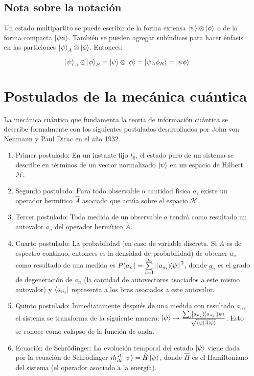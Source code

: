 \subsection{Nota sobre la notación}

Un estado multipartito se puede escribir de la forma extensa $\ket{\psi} \otimes \ket{\phi}$ o de la forma compacta $\ket{\psi \phi}$. También se pueden agregar subíndices para hacer énfasis en las particiones $\ket{\psi}_A \otimes \ket{\phi}$. Entonces:

\begin{equation*}
    \ket{\psi}_A \otimes \ket{\phi}_B = \ket{\psi} \otimes \ket{\phi} = \ket{\psi_A \phi_B} = \ket{\psi\phi}
\end{equation*}

\section{Postulados de la mecánica cuántica}

La mecánica cuántica que fundamenta la teoría de información cuántica se describe formalmente con los siguientes postulados desarrollados por John von Neumann y Paul Dirac en el año 1932.

\begin{enumerate}
    \item Primer postulado: En un instante fijo $t_0$, el estado puro de un sistema se describe en términos de un vector normalizado $\ket{\psi}$ en un espacio de Hilbert $\mathcal{H}$.
    \item Segundo postulado: Para todo observable o cantidad física $a$, existe un operador hermítico $\hat{A}$ asociado que actúa sobre el espacio $\mathcal{H}$
    \item Tercer postulado: Toda medida de un observable $a$ tendrá como resultado un autovalor $a_n$ del operador hermítico $\hat{A}$.
    \item Cuarto postulado: La probabilidad (en caso de variable discreta. Si $\hat{A}$ es de espectro continuo, entonces es la densidad de probabilidad) de obtener $a_n$ como resultado de una medida es $P(a_n) = \sum\limits_{i=1}^{g_n} \abs{\ketbra{a_{n_i}}{\psi}}^2$, donde $g_n$ es el grado de degeneración de $a_n$ (la cantidad de autovectores asociados a este mismo autovalor) y $\bra{a_{n_i}}$ representa a los bras asociados a este autovalor.
    \item Quinto postulado: Inmediatamente después de una medida con resultado $a_n$, el sistema se transforma de la siguiente manera: $\ket{\psi} \rightarrow \frac{\sum_i \ketbra{a_{n_i}}{a_{n_i}} \ket{\psi}}{\sqrt{\bra{\psi} \hat{A} \ket{\psi}}}$. Esto se conoce como colapso de la función de onda.
    \item Ecuación de Schrödinger: La evolución temporal del estado $\ket{\psi}$ viene dada por la ecuación de Schrödinger $i \hbar \frac{d}{d t} \ket{\psi} = \hat{H} \ket{\psi}$, donde $\hat{H}$ es el Hamiltoniano del sistema (el operador asociado a la energía).
\end{enumerate}

